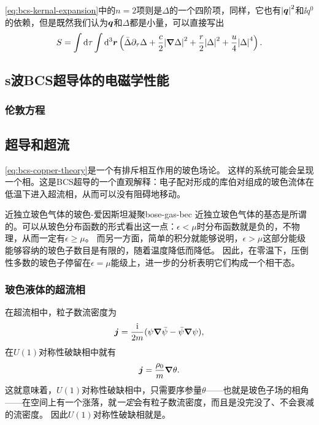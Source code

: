 
\eqref{eq:bcs-kernal-expansion}中的$n=2$项则是$\Delta$的一个四阶项，同样，它也有$\abs{\vb*{q}}^2$和$\ii q^0$的依赖，但是既然我们认为$\vb*{q}$和$\Delta$都是小量，可以直接写出
\begin{equation}
    S = \int \dd{\tau} \int \dd[3]{\vb*{r}} \left( \bar{\Delta} \partial_\tau \Delta + \frac{c}{2} \abs{\grad{\Delta}}^2 + \frac{r}{2} \abs{\Delta}^2 + \frac{u}{4} \abs{\Delta}^4 \right).
    \label{eq:bcs-copper-theory}
\end{equation}



\subsection{s波BCS超导体的电磁学性能}

\subsubsection{伦敦方程}


\subsection{超导和超流}

\eqref{eq:bcs-copper-theory}是一个有排斥相互作用的玻色场论。
这样的系统可能会呈现一个相。这是BCS超导的一个直观解释：电子配对形成的库伯对组成的玻色流体在低温下进入超流相，从而可以没有阻碍地移动。

\begin{back}{近独立玻色气体的玻色-爱因斯坦凝聚}{bose-gas-bec}
    近独立玻色气体的基态是所谓的。可以从玻色分布函数的形式看出这一点：$\epsilon < \mu$时分布函数就是负的，不物理，从而一定有$\epsilon \geq \mu$。
    而另一方面，简单的积分就能够说明，$\epsilon > \mu$这部分能级能够容纳的玻色子数目是有限的，随着温度降低而降低。
    因此，在零温下，压倒性多数的玻色子停留在$\epsilon = \mu$能级上，进一步的分析表明它们构成一个相干态。
\end{back}

\subsubsection{玻色液体的超流相}

在超流相中，粒子数流密度为
\[
    \vb*{j} = \frac{\mathrm{i}}{2m} ( \psi \grad{\bar{\psi}} - \bar{\psi} \grad{\psi} ),
\]
在$U(1)$对称性破缺相中就有
\begin{equation}
    \vb*{j} = \frac{\rho_0}{m} \grad{\theta}.
\end{equation}
这就意味着，$U(1)$对称性破缺相中，只需要序参量$\theta$——也就是玻色子场的相角——在空间上有一个涨落，就\emph{一定}会有粒子数流密度，而且是没完没了、不会衰减的流密度。
因此$U(1)$对称性破缺相就是。

